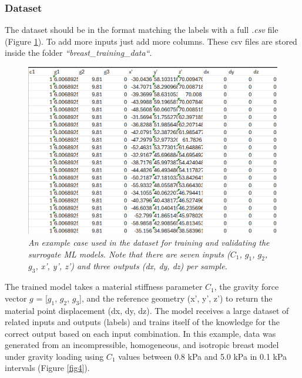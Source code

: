 \documentclass[11pt]{article}
\begin{document}
\subsubsection{Dataset}
The dataset should be in the format matching the labels with a full \textit{.csv} file (Figure \ref{fig3}). To add more inputs just add more columns. These csv files are stored inside the folder \textit{``breast\_training\_data``}.

\begin{figure}
\centering
\includegraphics[scale=0.7]{Images/breast/machine_learning/data_structure.png}
\caption{\textit{\label{fig3}An example case used in the dataset for training and validating the surrogate ML models. Note that there are seven inputs ($C_{1}$, $g_{1}$, $g_{2}$, $g_{3}$, x', y', z') and three outputs (dx, dy, dz) per sample.}}
\end{figure}

The trained model takes a material stiffness parameter $C_{1}$, the gravity force vector $g$ = [$g_{1}$, $g_{2}$, $g_{3}$], and the reference geometry (x', y', z') to return the material point displacement (dx, dy, dz). The model receives a large dataset of related inputs and outputs (labels) and trains itself of the knowledge for the correct output based on each input combination. In this example, data was generated from an incompressible, homogeneous, and isotropic breast model under gravity loading using $C_{1}$ values between 0.8 kPa and 5.0 kPa in 0.1 kPa intervals (Figure \ref{fig4}).
\end{document}
